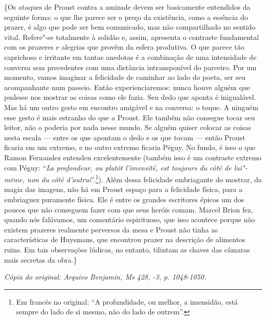 \{Os ataques de Proust contra a amizade devem ser basicamente entendidos
da seguinte forma: o que lhe parece ser o preço da existência, como a
essência do prazer, é algo que pode ser bem comunicado, mas não
compartilhado no sentido vital. Refere"-se totalmente à solidão e, assim,
apresenta o contraste fundamental com os prazeres e alegrias que provêm
da esfera produtiva. O que parece tão caprichoso e irritante em tantas
anedotas é a combinação de uma intensidade de conversa sem precedentes
com uma distância intransponível do parceiro. Por um momento, vamos
imaginar a felicidade de caminhar ao lado do poeta, ser seu acompanhante
num passeio. Então experienciaremos: nunca houve alguém que pudesse nos
mostrar as coisas como ele fazia. Seu dedo que aponta é inigualável. Mas
há um outro gesto em encontro amigável e na conversa: o toque. A ninguém
esse gesto é mais estranho do que a Proust. Ele também não consegue
tocar seu leitor, não o poderia por nada nesse mundo. Se alguém quiser
colocar as coisas nesta escala --- entre os que apontam o dedo e os que
tocam --- então Proust ficaria em um extremo, e no outro extremo ficaria
Péguy. No fundo, é isso o que Ramon Fernandez entendeu excelentemente
(também isso é um contraste extremo com Péguy: ``\emph{La profondeur, ou
plutôt l'imensité, est toujours du côté de lui"-même, non du côté
d'autrui}''.\footnote{Em francês no original: ``A profundidade, ou melhor, a imensidão,
  está sempre do lado de si mesmo, não do lado de outrem''. \versal{[N. T.]}}). Além
dessa felicidade embriagante do mostrar, da magia das imagens, não há em
Proust espaço para a felicidade física, para a embriaguez puramente
física. Ele é entre os grandes escritores épicos um dos poucos que não
conseguem fazer com que seus heróis comam. Marcel Brion fez, quando nós
falávamos, um comentário espirituoso, que isso acontece porque não
existem prazeres realmente perversos da mesa e Proust não tinha as
características de Huysmans, que encontrou prazer na descrição de
alimentos ruins. Em tais observações lúdicas, no entanto, tilintam as
chaves das câmaras mais secretas da obra.\}

\begin{flushright}
\emph{\small{Cópia do original: Arquivo Benjamin, Ms 428, -3, p. 1048-1050.}}
\end{flushright}

